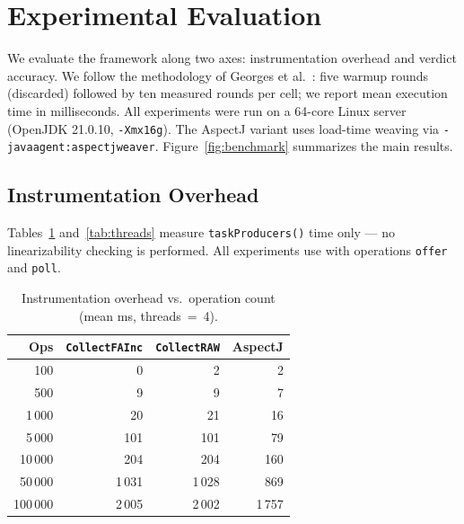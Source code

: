 \documentclass[preprint,12pt]{elsarticle}
\begin{document}
\section{Experimental Evaluation}
\label{sec:experiments}

We evaluate the framework along two axes: instrumentation overhead
and verdict accuracy. We follow the methodology of Georges
et al.~\cite{georges2007}: five warmup rounds (discarded) followed by
ten measured rounds per cell; we report mean execution time in
milliseconds. All experiments were run on a 64-core Linux server
(OpenJDK 21.0.10, \texttt{-Xmx16g}). The AspectJ variant uses
load-time weaving via \texttt{-javaagent:aspectjweaver}.
Figure~\ref{fig:benchmark} summarizes the main results.

\subsection{Instrumentation Overhead}

Tables~\ref{tab:ops} and~\ref{tab:threads} measure \texttt{taskProducers()}
time only --- no linearizability checking is performed. All experiments
use \texttt{} with operations
\texttt{offer} and \texttt{poll}.

\begin{table}[h!]
\centering
\scriptsize
\caption{Instrumentation overhead vs.\ operation count (mean ms,
         threads~=~4).}
\label{tab:ops}
\begin{tabular}{rrrr}
\hline
\textbf{Ops} & \texttt{CollectFAInc} & \texttt{CollectRAW} & AspectJ \\
\hline
       100 &     0 &     2 &     2 \\
       500 &     9 &     9 &     7 \\
     1\,000 &    20 &    21 &    16 \\
     5\,000 &   101 &   101 &    79 \\
    10\,000 &   204 &   204 &   160 \\
    50\,000 & 1\,031 & 1\,028 &   869 \\
   100\,000 & 2\,005 & 2\,002 & 1\,757 \\
\hline
\end{tabular}
\end{table}
\end{document}
